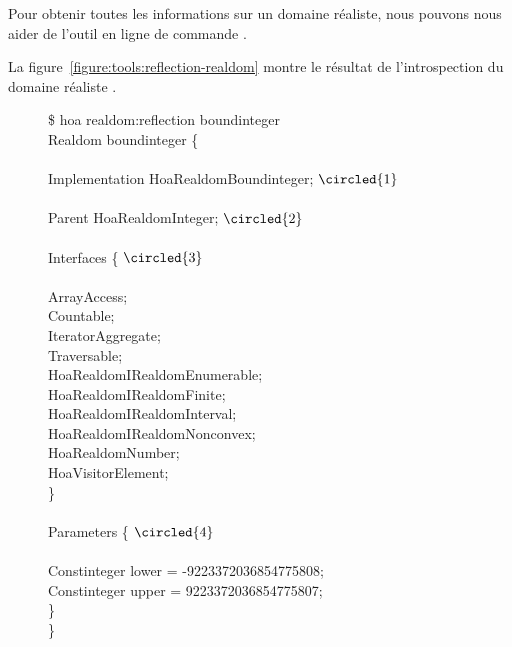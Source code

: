 Pour obtenir toutes les informations sur un domaine réaliste, nous pouvons nous
aider de l'outil en ligne de commande .

\begin{example}

La figure~\ref{figure:tools:reflection-realdom} montre le résultat de
l'introspection du domaine réaliste .
%
\begin{figure}

\begin{bigpre}
\$ hoa realdom:reflection boundinteger \\
Realdom boundinteger \{ \\
 \\
    Implementation Hoa\bslash{}Realdom\bslash{}Boundinteger; \(\circled{1}\) \\
 \\
    Parent Hoa\bslash{}Realdom\bslash{}Integer; \(\circled{2}\) \\
 \\
    Interfaces \{ \(\circled{3}\) \\
 \\
        ArrayAccess; \\
        Countable; \\
        IteratorAggregate; \\
        Traversable; \\
        Hoa\bslash{}Realdom\bslash{}IRealdom\bslash{}Enumerable; \\
        Hoa\bslash{}Realdom\bslash{}IRealdom\bslash{}Finite; \\
        Hoa\bslash{}Realdom\bslash{}IRealdom\bslash{}Interval; \\
        Hoa\bslash{}Realdom\bslash{}IRealdom\bslash{}Nonconvex; \\
        Hoa\bslash{}Realdom\bslash{}Number; \\
        Hoa\bslash{}Visitor\bslash{}Element; \\
    \} \\
 \\
    Parameters \{ \(\circled{4}\) \\
 \\
        [#0 optional] Constinteger lower = -9223372036854775808; \\
        [#1 optional] Constinteger upper = 9223372036854775807; \\
    \} \\
\}
\end{bigpre}


\end{figure}
\end{example}

